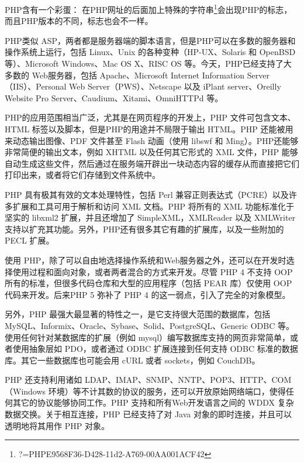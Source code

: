 



PHP含有一个彩蛋： 在PHP网址的后面加上特殊的字符串\footnote{?=PHPE9568F36-D428-11d2-A769-00AA001ACF42}会出现PHP的标志，而且PHP版本的不同，标志也会不一样。

PHP类似 ASP，两者都是服务器端的脚本语言，但是PHP可以在多数的服务器和操作系统上运行，包括 Linux、Unix 的各种变种（HP-UX、Solaris 和 OpenBSD等）、Microsoft Windows、Mac OS X、RISC OS 等。今天，PHP已经支持了大多数的 Web服务器，包括 Apache、Microsoft Internet Information Server（IIS）、Personal Web Server（PWS）、Netscape 以及 iPlant server、Oreilly Website Pro Server、Caudium、Xitami、OmniHTTPd 等。



PHP的应用范围相当广泛，尤其是在网页程序的开发上，PHP 文件可包含文本、HTML 标签以及脚本，但是PHP的用途并不局限于输出 HTML。PHP 还能被用来动态输出图像、PDF 文件甚至 Flash 动画（使用 libswf 和 Ming）。PHP还能够非常简便的输出文本，例如 XHTML 以及任何其它形式的 XML 文件，PHP 能够自动生成这些文件，然后通过在服务端开辟出一块动态内容的缓存从而直接把它们打印出来，或者将它们存储到文件系统中。







PHP 具有极其有效的文本处理特性，包括 Perl 兼容正则表达式（PCRE）以及许多扩展和工具可用于解析和访问 XML 文档。PHP 将所有的 XML 功能标准化于坚实的 libxml2 扩展，并且还增加了 SimpleXML，XMLReader 以及 XMLWriter 支持以扩充其功能。另外，PHP还有很多其它有趣的扩展库，以及一些附加的 PECL 扩展。






使用 PHP，除了可以自由地选择操作系统和Web服务器之外，还可以在开发时选择使用过程和面向对象，或者两者混合的方式来开发。尽管 PHP 4 不支持 OOP 所有的标准，但很多代码仓库和大型的应用程序（包括 PEAR 库）仅使用 OOP 代码来开发。后来PHP 5 弥补了 PHP 4 的这一弱点，引入了完全的对象模型。

另外，PHP 最强大最显著的特性之一，是它支持很大范围的数据库，包括MySQL、Informix、Oracle、Sybase、Solid、PostgreSQL、Generic ODBC 等。使用任何针对某数据库的扩展（例如 mysql）编写数据库支持的网页非常简单，或者使用抽象层如 PDO，或者通过 ODBC 扩展连接到任何支持 ODBC 标准的数据库。其它一些数据库也可能会用 cURL 或者 sockets，例如 CouchDB。



PHP 还支持利用诸如 LDAP、IMAP、SNMP、NNTP、POP3、HTTP、COM（Windows 环境）等不计其数的协议的服务，还可以开放原始网络端口，使得任何其它的协议能够协同工作。PHP 支持和所有Web开发语言之间的 WDDX 复杂数据交换。关于相互连接，PHP 已经支持了对 Java 对象的即时连接，并且可以透明地将其用作 PHP 对象。









